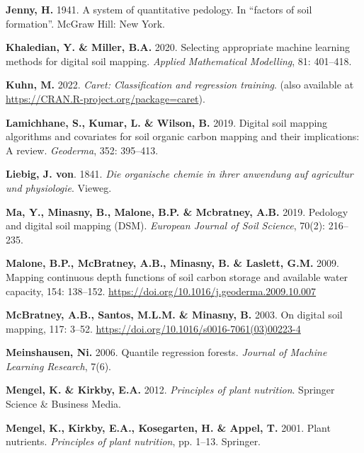 \documentclass[
  10pt,
  b5paper,
  oneside]{book}
\newlength{\cslhangindent}
\newlength{\cslentryspacingunit} %
\newenvironment{CSLReferences}[2] %
 {%
  \setlength{\parindent}{0pt}
  \ifodd #1
  \let\oldpar\par
  \def\par{\hangindent=\cslhangindent\oldpar}
  \fi
  \setlength{\parskip}{#2\cslentryspacingunit}
 }%
 {}
\begin{document}
\begin{CSLReferences}{0}{0}
\leavevmode{}%
\textbf{Jenny, H.} 1941. A system of quantitative pedology. In {``factors of soil formation''}. McGraw Hill: New York.

\leavevmode{}%
\textbf{Khaledian, Y. \& Miller, B.A.} 2020. Selecting appropriate machine learning methods for digital soil mapping. \emph{Applied Mathematical Modelling}, 81: 401--418.

\leavevmode{}%
\textbf{Kuhn, M.} 2022. \emph{Caret: Classification and regression training}. (also available at \url{https://CRAN.R-project.org/package=caret}).

\leavevmode{}%
\textbf{Lamichhane, S., Kumar, L. \& Wilson, B.} 2019. Digital soil mapping algorithms and covariates for soil organic carbon mapping and their implications: A review. \emph{Geoderma}, 352: 395--413.

\leavevmode{}%
\textbf{Liebig, J. von}. 1841. \emph{Die organische chemie in ihrer anwendung auf agricultur und physiologie}. Vieweg.

\leavevmode{}%
\textbf{Ma, Y., Minasny, B., Malone, B.P. \& Mcbratney, A.B.} 2019. Pedology and digital soil mapping (DSM). \emph{European Journal of Soil Science}, 70(2): 216--235.

\leavevmode{}%
\textbf{Malone, B.P., McBratney, A.B., Minasny, B. \& Laslett, G.M.} 2009. Mapping continuous depth functions of soil carbon storage and available water capacity, 154: 138--152. \url{https://doi.org/10.1016/j.geoderma.2009.10.007}

\leavevmode{}%
\textbf{McBratney, A.B., Santos, M.L.M. \& Minasny, B.} 2003. On digital soil mapping, 117: 3--52. \url{https://doi.org/10.1016/s0016-7061(03)00223-4}

\leavevmode{}%
\textbf{Meinshausen, Ni.} 2006. Quantile regression forests. \emph{Journal of Machine Learning Research}, 7(6).

\leavevmode{}%
\textbf{Mengel, K. \& Kirkby, E.A.} 2012. \emph{Principles of plant nutrition}. Springer Science \& Business Media.

\leavevmode{}%
\textbf{Mengel, K., Kirkby, E.A., Kosegarten, H. \& Appel, T.} 2001. Plant nutrients. \emph{Principles of plant nutrition}, pp. 1--13. Springer.


\end{CSLReferences}
\end{document}
